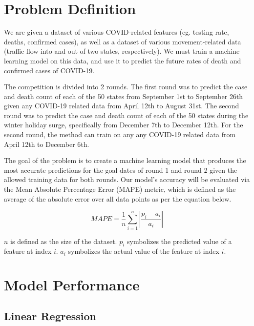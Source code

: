 \documentclass[sigconf,nonacm]{acmart}
\begin{document}
\section{Problem Definition}

We are given a dataset of various COVID-related features (eg. testing rate,
deaths, confirmed cases), as well as a dataset of various movement-related data
(traffic flow into and out of two states, respectively). 
We must train a machine learning model on this data, and use it to predict the
future rates of death and confirmed cases of COVID-19. 

The competition is divided into 2 rounds. The first round was to predict the
case and death count of each of the 50 states from September 1st to September
26th given any COVID-19 related data from April 12th to August 31st. The second
round was to predict the case and death count of each of the 50 states during
the winter holiday surge, specifically from December 7th to December 12th. 
For the second round, the method can train on any any COVID-19 related data from
April 12th to December 6th. 

The goal of the problem is to create a machine learning model that produces
the most accurate predictions for the goal dates of round 1 and round 2
given the allowed training data for both rounds.
Our model's accuracy will be evaluated via the Mean Absolute Percentage Error
(MAPE) metric, which is defined as the average of the absolute error over all
data points as per the equation below. 

$$MAPE = \frac{1}{n} \sum_{i = 1}^{n} |\frac{p_i - a_i}{a_i} |$$

$n$ is defined as the size of the dataset. $p_i$ symbolizes the predicted value
of a feature at index $i$. $a_i$ symbolizes the actual value of the feature at
index $i$.



\section{Model Performance}

\subsection{Linear Regression}
\end{document}
